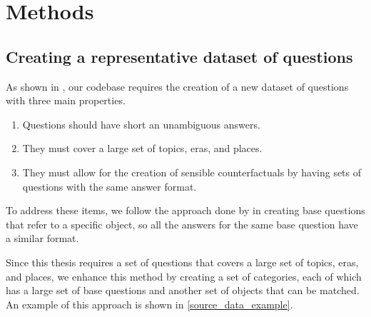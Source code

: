\section{Methods}

\subsection{Creating a representative dataset of questions}
\label{creating_dataset}

As shown in , our codebase requires the creation of a new dataset of questions with three main properties.

\begin{enumerate}
	\item Questions should have short an unambiguous answers. \label{q_short}
	\item They must cover a large set of topics, eras, and places. \label{q_widespread}
	\item They must allow for the creation of sensible counterfactuals by having sets of questions with the same answer format. \label{q_counterfactual}
\end{enumerate}

To address these items, we follow the approach done by \citeauthor{factual_recall} in creating base questions that refer to a specific object, so all the answers for the same base question have a similar format.

Since this thesis requires a set of questions that covers a large set of topics, eras, and places, we enhance this method by creating a set of categories, each of which has a large set of base questions and another set of objects that can be matched.
An example of this approach is shown in \cref{source_data_example}.

